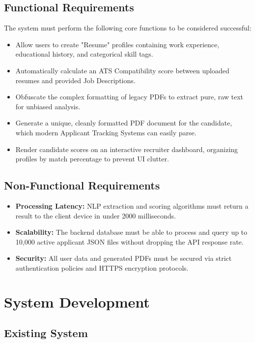 \documentclass[12pt,a4paper]{report}
\begin{document}
\section{Functional Requirements}

The system must perform the following core functions to be considered successful:
\begin{itemize}
    \item Allow users to create "Resume" profiles containing work experience, educational history, and categorical skill tags.
    \item Automatically calculate an ATS Compatibility score between uploaded resumes and provided Job Descriptions.
    \item Obfuscate the complex formatting of legacy PDFs to extract pure, raw text for unbiased analysis.
    \item Generate a unique, cleanly formatted PDF document for the candidate, which modern Applicant Tracking Systems can easily parse.
    \item Render candidate scores on an interactive recruiter dashboard, organizing profiles by match percentage to prevent UI clutter.
\end{itemize}

\section{Non-Functional Requirements}

\begin{itemize}
    \item \textbf{Processing Latency:} NLP extraction and scoring algorithms must return a result to the client device in under 2000 milliseconds.
    \item \textbf{Scalability:} The backend database must be able to process and query up to 10,000 active applicant JSON files without dropping the API response rate.
    \item \textbf{Security:} All user data and generated PDFs must be secured via strict authentication policies and HTTPS encryption protocols.
\end{itemize}

\chapter{System Development}

\section{Existing System}
\end{document}
